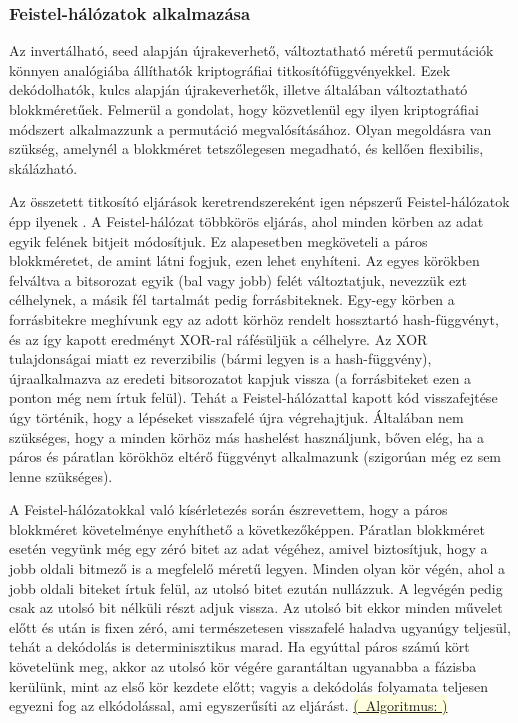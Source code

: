 \documentclass[
    parspace,
    noindent,
    nohyp,
]{elteiktdk}[2023/04/10]
\newcommand{\algorithmref}[1]{\hyperref[algorithm:#1]{\colorbox{lightyellow}{%
(\textrightarrow~Algoritmus: \nameref*{algorithm:#1})}}}
\begin{document}
\subsubsection{Feistel-hálózatok alkalmazása}

Az invertálható, seed alapján újrakeverhető, változtatható méretű permutációk könnyen analógiába állíthatók kriptográfiai titkosítófüggvényekkel.
Ezek dekódolhatók, kulcs alapján újrakeverhetők, illetve általában változtatható blokkméretűek.
Felmerül a gondolat, hogy közvetlenül egy ilyen kriptográfiai módszert alkalmazzunk a permutáció megvalósításához.
Olyan megoldásra van szükség, amelynél a blokkméret tetszőlegesen megadható, és kellően flexibilis, skálázható.

Az összetett titkosító eljárások keretrendszereként igen népszerű Feistel-hálózatok épp ilyenek%
\cite{Easttom2022Feistel}.
A Feistel-hálózat többkörös eljárás, ahol minden körben az adat egyik felének bitjeit módosítjuk.
Ez alapesetben megköveteli a páros blokkméretet, de amint látni fogjuk, ezen lehet enyhíteni.
Az egyes körökben felváltva a bitsorozat egyik (bal vagy jobb) felét változtatjuk,
nevezzük ezt célhelynek, a másik fél tartalmát pedig forrásbiteknek.
Egy-egy körben a forrásbitekre meghívunk egy az adott körhöz rendelt hossztartó hash-függvényt,
és az így kapott eredményt XOR-ral ráfésüljük a célhelyre.
Az XOR tulajdonságai miatt ez reverzibilis (bármi legyen is a hash-függvény),
újraalkalmazva az eredeti bitsorozatot kapjuk vissza
(a forrásbiteket ezen a ponton még nem írtuk felül).
Tehát a Feistel-hálózattal kapott kód visszafejtése úgy történik, hogy a lépéseket visszafelé újra végrehajtjuk.
Általában nem szükséges, hogy a minden körhöz más hashelést használjunk,
bőven elég, ha a páros és páratlan körökhöz eltérő függvényt alkalmazunk (szigorúan még ez sem lenne szükséges).

A Feistel-hálózatokkal való kísérletezés során észrevettem,
hogy a páros blokkméret követelménye enyhíthető a következőképpen.
Páratlan blokkméret esetén vegyünk még egy zéró bitet az adat végéhez,
amivel biztosítjuk, hogy a jobb oldali bitmező is a megfelelő méretű legyen.
Minden olyan kör végén, ahol a jobb oldali biteket írtuk felül, az utolsó bitet ezután nullázzuk.
A legvégén pedig csak az utolsó bit nélküli részt adjuk vissza.
Az utolsó bit ekkor minden művelet előtt és után is fixen zéró,
ami természetesen visszafelé haladva ugyanúgy teljesül, tehát a dekódolás is determinisztikus marad.
Ha egyúttal páros számú kört követelünk meg,
akkor az utolsó kör végére garantáltan ugyanabba a fázisba kerülünk, mint az első kör kezdete előtt;
vagyis a dekódolás folyamata teljesen egyezni fog az elkódolással, ami egyszerűsíti az eljárást.
\algorithmref{feistel}
\end{document}
